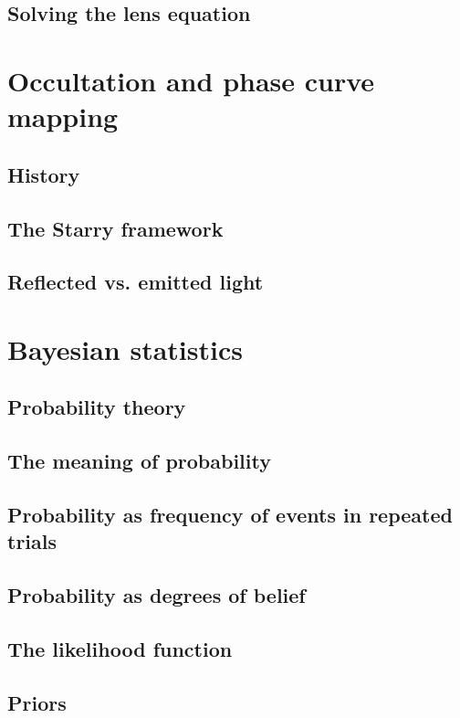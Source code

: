 \documentclass[11pt]{report}
\begin{document}
\subsection{Solving the lens equation}

\section{Occultation and phase curve mapping}
\label{sec:occultations}
\subsection{History}
\subsection{The Starry framework}
\subsection{Reflected vs. emitted light}

\section{Bayesian statistics}
\label{sec:bayes}
\subsection{Probability theory}
\subsection{The meaning of probability}
\subsection{Probability as frequency of events in repeated trials}
\subsection{Probability as degrees of belief}
\subsection{The likelihood function}
\subsection{Priors}
\end{document}
